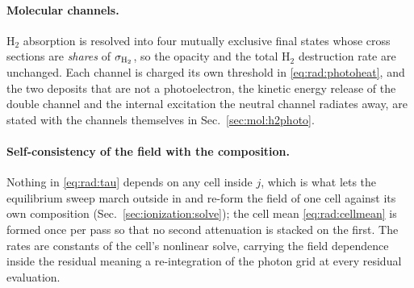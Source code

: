 \paragraph{Molecular channels.} H$_2$ absorption is resolved into four
mutually exclusive final states whose cross sections are \emph{shares} of
$\sigma_{{\rm H}_2}$, so the opacity and the total H$_2$ destruction rate are
unchanged. Each channel is charged its own threshold in
\eqref{eq:rad:photoheat}, and the two deposits that are not a photoelectron,
the kinetic energy release of the double channel and the internal excitation
the neutral channel radiates away, are stated with the channels themselves in
Sec.~\ref{sec:mol:h2photo}.

\paragraph{Self-consistency of the field with the composition.} Nothing in
\eqref{eq:rad:tau} depends on any cell inside $j$, which is what lets the
equilibrium sweep march outside in and re-form the field of one cell against
its own composition (Sec.~\ref{sec:ionization:solve}); the cell mean
\eqref{eq:rad:cellmean} is formed once per pass so that no second attenuation
is stacked on the first. The rates are constants of the cell's nonlinear
solve, carrying the field dependence inside the residual meaning a
re-integration of the photon grid at every residual evaluation.

